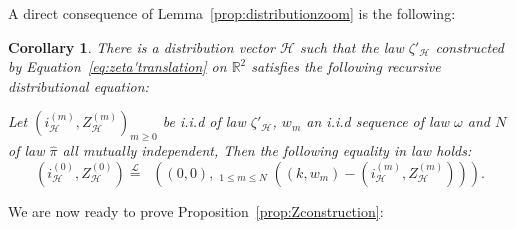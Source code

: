 \documentclass[11pt]{article}
\DeclareMathOperator{\lex}{lex}
\DeclareMathOperator*{\maxlex}{\overset{\lex}{\max}}
\newtheorem{coro}{Corollary}[section]
\begin{document}
A direct consequence of Lemma~\ref{prop:distributionzoom} is the following:
\begin{coro}\label{coro:Zlawexistencebis}
    There is a distribution vector $\mathcal{H}$ such that the law $\zeta'_{\mathcal{H}}$ constructed by Equation~\eqref{eq:zeta'translation} on $\mathbb{R}^2$ satisfies the following recursive distributional equation:

    Let $(i_{\mathcal{H}}^{(m)},Z_{\mathcal{H}}^{(m)})_{m \geq 0}$ be i.i.d of law $\zeta'_{\mathcal{H}}$, $w_m$ an i.i.d sequence of law $\omega$ and $N$ of law $\hat{\pi}$ all mutually independent, Then the following equality in law holds:
    \begin{equation}\label{eq:Zlawbis}
    (i_{\mathcal{H}}^{(0)},Z_{\mathcal{H}}^{(0)}) \overset{\mathcal{L}}{=} \maxlex \left( (0,0), \maxlex_{1 \leq m \leq N}  \left( (k,w_m)-(i_{\mathcal{H}}^{(m)},Z_{\mathcal{H}} ^{(m)}) \right)  \right). 
    \end{equation}
\end{coro}

We are now ready to prove Proposition~\ref{prop:Zconstruction}:
\end{document}
